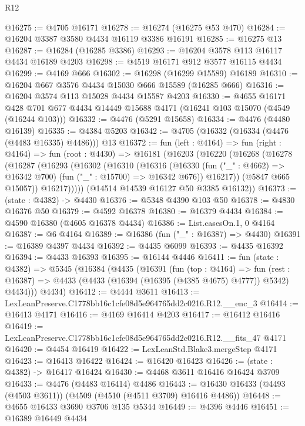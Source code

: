 \begin{lexlean}{R12}
\begin{coremodule}
@16275 := @4705 @16171
@16278 := @16274 (@16275 @53 @470)
@16284 := @16204 @3387 @3580 @4434 @16119 @3386 @16191
@16285 := @16275 @13
@16287 := @16284 (@16285 @3386)
@16293 := @16204 @3578 @113 @16117 @4434 @16189 @4203
@16298 := @4519 @16171 @912 @3577 @16115 @4434
@16299 := @4169 @666
@16302 := @16298 (@16299 @15589) @16189
@16310 := @16204 @667 @3576 @4434 @15030 @666 @15589 (@16285 @666)
@16316 := @16204 @3574 @113 @15028 @4434 @15587 @4203
@16330 := @4655
    @16171
    @428
    @701
    @677
    @4434
    @14449
    @15688
    @4171
    (@16241 @103 @15070 (@4549 (@16244 @103)))
@16332 := @4476 (@5291 @15658)
@16334 := @4476 (@4480 @16139)
@16335 := @4384 @5203
@16342 := @4705 (@16332 (@16334 (@4476 (@4483 @16335) @4486))) @13
@16372 := fun (left : @4164) =>
  fun (right : @4164) =>
  fun (root : @4430) =>
  @16181
    (@16203
      (@16220
        (@16268
          (@16278
            (@16287
              (@16293
                (@16302
                  (@16310
                    (@16316
                      (@16330
                        (fun ("_" : @4662) => @16342 @700)
                        (fun ("_" : @15700) => @16342 @676))
                      @16217))
                  (@5847 @665 @15057))
                @16217)))))
      (@14514 @14539 @16127 @50 @3385 @16132))
@16373 := (state : @4382) -> @4430
@16376 := @5348 @4390 @103 @50
@16378 := @4830 @16376 @50
@16379 := @4592 @16378
@16380 := @16379 @4434
@16384 := @4590 @16380 (@4605 @16378 @4434)
@16386 := List.casesOn.{1, 0} @4164
@16387 := @6 @4164
@16389 := @16386 (fun ("_" : @16387) => @4430)
@16391 := @16389 @4397 @4434
@16392 := @4435 @6099
@16393 := @4435 @16392
@16394 := @4433 @16393
@16395 := @16144 @4446
@16411 := fun (state : @4382) =>
  @5345
    (@16384
      (@4435
        (@16391
          (fun (top : @4164) =>
          fun (rest : @16387) => @4433 (@4433 (@16394 (@16395 (@4385 @4675) @4777)) @5342) @4434)))
      @4434)
@16412 := @4444 @3611
@16413 := LexLeanPreserve.C1778bb16c1cfe08d5e964765dd2c0216.R12.__enc_3
@16414 := @16413 @4171
@16416 := @4169 @16414 @4203
@16417 := @16412 @16416
@16419 := LexLeanPreserve.C1778bb16c1cfe08d5e964765dd2c0216.R12.__fits_47 @4171
@16420 := @4454 @16419
@16422 := LexLeanStd.Blake3.mergeStep @4171
@16423 := @16413 @16422
@16424 := @16420 @16423
@16426 := (state : @4382) -> @16417 @16424
@16430 := @4468 @3611 @16416 @16424 @3709
@16433 := @4476 (@4483 @16414) @4486
@16443 := @16430 @16433 (@4493 (@4503 @3611)) (@4509 (@4510 (@4511 @3709) @16416 @4486))
@16448 := @4655 @16433 @3690 @3706 @135 @5344
@16449 := @4396 @4446
@16451 := @16389 @16449 @4434

\end{coremodule}
\end{lexlean}
